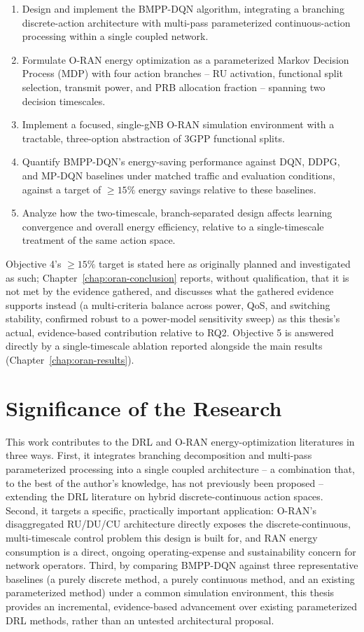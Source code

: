 \begin{enumerate}
  \item Design and implement the BMPP-DQN algorithm, integrating a
    branching discrete-action architecture with multi-pass parameterized
    continuous-action processing within a single coupled network.
  \item Formulate O-RAN energy optimization as a parameterized Markov
    Decision Process (MDP) with four action branches -- RU activation,
    functional split selection, transmit power, and PRB allocation fraction
    -- spanning two decision timescales.
  \item Implement a focused, single-gNB O-RAN simulation environment with
    a tractable, three-option abstraction of 3GPP functional splits.
  \item Quantify BMPP-DQN's energy-saving performance against DQN, DDPG,
    and MP-DQN baselines under matched traffic and evaluation conditions,
    against a target of $\geq 15\%$ energy savings relative to these
    baselines.
  \item Analyze how the two-timescale, branch-separated design affects
    learning convergence and overall energy efficiency, relative to a
    single-timescale treatment of the same action space.
\end{enumerate}

Objective 4's $\geq15\%$ target is stated here as originally planned and
investigated as such; Chapter~\ref{chap:oran-conclusion} reports, without
qualification, that it is not met by the evidence gathered, and discusses
what the gathered evidence supports instead (a multi-criteria balance
across power, QoS, and switching stability, confirmed robust to a
power-model sensitivity sweep) as this thesis's actual, evidence-based
contribution relative to RQ2. Objective 5 is answered directly by a
single-timescale ablation reported alongside the main results
(Chapter~\ref{chap:oran-results}).

\section{Significance of the Research}
\label{sec:oran-significance}

This work contributes to the DRL and O-RAN energy-optimization literatures
in three ways. First, it integrates branching decomposition and multi-pass
parameterized processing into a single coupled architecture -- a combination
that, to the best of the author's knowledge, has not previously been
proposed -- extending the DRL literature on hybrid discrete-continuous
action spaces. Second, it targets a specific, practically important
application: O-RAN's disaggregated RU/DU/CU architecture directly exposes
the discrete-continuous, multi-timescale control problem this design is
built for, and RAN energy consumption is a direct, ongoing operating-expense
and sustainability concern for network operators. Third, by comparing
BMPP-DQN against three representative baselines (a purely discrete method,
a purely continuous method, and an existing parameterized method) under a
common simulation environment, this thesis provides an incremental,
evidence-based advancement over existing parameterized DRL methods, rather
than an untested architectural proposal.

